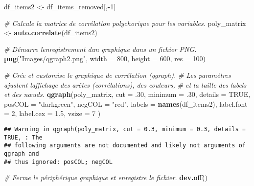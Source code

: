 \documentclass[
]{article}
\newenvironment{Shaded}{\begin{snugshade}}{\end{snugshade}}
\newcommand{\AttributeTok}[1]{\textcolor[rgb]{0.13,0.29,0.53}{#1}}
\newcommand{\CommentTok}[1]{\textcolor[rgb]{0.56,0.35,0.01}{\textit{#1}}}
\newcommand{\ConstantTok}[1]{\textcolor[rgb]{0.56,0.35,0.01}{#1}}
\newcommand{\DecValTok}[1]{\textcolor[rgb]{0.00,0.00,0.81}{#1}}
\newcommand{\FloatTok}[1]{\textcolor[rgb]{0.00,0.00,0.81}{#1}}
\newcommand{\FunctionTok}[1]{\textcolor[rgb]{0.13,0.29,0.53}{\textbf{#1}}}
\newcommand{\NormalTok}[1]{#1}
\newcommand{\OtherTok}[1]{\textcolor[rgb]{0.56,0.35,0.01}{#1}}
\newcommand{\SpecialCharTok}[1]{\textcolor[rgb]{0.81,0.36,0.00}{\textbf{#1}}}
\newcommand{\StringTok}[1]{\textcolor[rgb]{0.31,0.60,0.02}{#1}}
\begin{document}
\begin{Shaded}
\begin{Highlighting}[]
\NormalTok{df\_items2 }\OtherTok{\textless{}{-}}\NormalTok{ df\_items\_removed[,}\SpecialCharTok{{-}}\DecValTok{1}\NormalTok{]}

\CommentTok{\# Calcule la matrice de corrélation polychorique pour les variables.}
\NormalTok{poly\_matrix }\OtherTok{\textless{}{-}} \FunctionTok{auto.correlate}\NormalTok{(df\_items2)}

\CommentTok{\# Démarre l\textquotesingle{}enregistrement d\textquotesingle{}un graphique dans un fichier PNG.}
\FunctionTok{png}\NormalTok{(}\StringTok{"Images/qgraph2.png"}\NormalTok{, }\AttributeTok{width =} \DecValTok{800}\NormalTok{, }\AttributeTok{height =} \DecValTok{600}\NormalTok{, }\AttributeTok{res =} \DecValTok{100}\NormalTok{)}

\CommentTok{\# Crée et customise le graphique de corrélation (qgraph).}
\CommentTok{\# Les paramètres ajustent l\textquotesingle{}affichage des arêtes (corrélations), des couleurs,}
\CommentTok{\# et la taille des labels et des nœuds.}
\FunctionTok{qgraph}\NormalTok{(poly\_matrix,}
       \AttributeTok{cut =}\NormalTok{ .}\DecValTok{30}\NormalTok{,}
       \AttributeTok{minimum =}\NormalTok{ .}\DecValTok{30}\NormalTok{,}
       \AttributeTok{details =} \ConstantTok{TRUE}\NormalTok{,}
       \AttributeTok{posCOL =} \StringTok{"darkgreen"}\NormalTok{,}
       \AttributeTok{negCOL =} \StringTok{"red"}\NormalTok{,}
       \AttributeTok{labels =} \FunctionTok{names}\NormalTok{(df\_items2),}
       \AttributeTok{label.font =} \DecValTok{2}\NormalTok{,}
       \AttributeTok{label.cex =} \FloatTok{1.5}\NormalTok{,}
       \AttributeTok{vsize =} \DecValTok{7}
\NormalTok{)}
\end{Highlighting}
\end{Shaded}

\begin{verbatim}
## Warning in qgraph(poly_matrix, cut = 0.3, minimum = 0.3, details = TRUE, : The
## following arguments are not documented and likely not arguments of qgraph and
## thus ignored: posCOL; negCOL
\end{verbatim}

\begin{Shaded}
\begin{Highlighting}[]
\CommentTok{\# Ferme le périphérique graphique et enregistre le fichier.}
\FunctionTok{dev.off}\NormalTok{()}
\end{Highlighting}
\end{Shaded}
\end{document}
